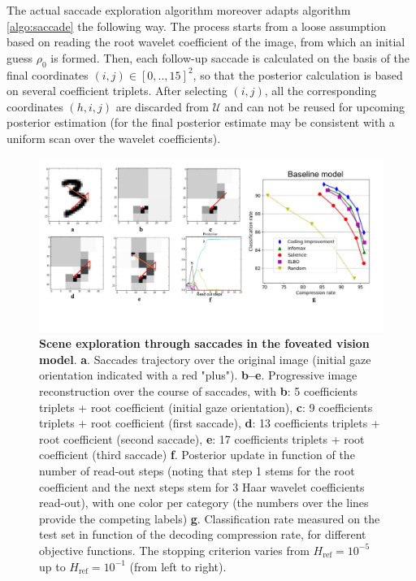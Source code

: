 \documentclass{article}
\begin{document}
The actual saccade exploration algorithm moreover adapts algorithm \ref{algo:saccade} the following way. The process starts from a loose assumption based on reading the root wavelet coefficient of the image, from which an initial guess $\rho_0$ is formed. Then, each follow-up saccade is calculated on the basis of the final coordinates $(i,j) \in [0,..,15]^2$, so that the posterior calculation is based on several coefficient triplets. After selecting $(i,j)$, all the corresponding coordinates $(h,i,j)$ are discarded from $\mathcal{U}$ and can not be reused for upcoming posterior estimation (for the final posterior estimate may be consistent with a uniform scan over the wavelet coefficients). 

\begin{figure}[b!]
	\centerline{
	\includegraphics[width=\linewidth]{img/NIPS-saccade.pdf}}
	\vspace{-.2cm}
	\caption{\textbf{Scene exploration through saccades in the foveated vision model}. \textbf{a}. Saccades trajectory over the original image (initial gaze orientation indicated with a red "plus"). \textbf{b--e}. Progressive image reconstruction over the course of saccades, with \textbf{b}: 5 coefficients triplets + root coefficient (initial gaze orientation), \textbf{c}: 9 coefficients triplets + root coefficient (first saccade), \textbf{d}: 13 coefficients triplets + root coefficient (second saccade), \textbf{e}: 17 coefficients triplets + root coefficient (third saccade) \textbf{f}. Posterior update in function of the number of read-out steps (noting that step 1 stems for the root coefficient and the next steps stem for 3 Haar wavelet coefficients read-out), with one color per category (the numbers over the lines provide the competing labels) \textbf{g}.  Classification rate measured on the test set in function of the decoding compression rate, for different objective functions. The stopping criterion varies from $H_\text{ref}=10^{-5}$ up to  $H_\text{ref}=10^{-1}$ (from left to right).}\label{fig:foveated-saccades}
\end{figure}
\end{document}
